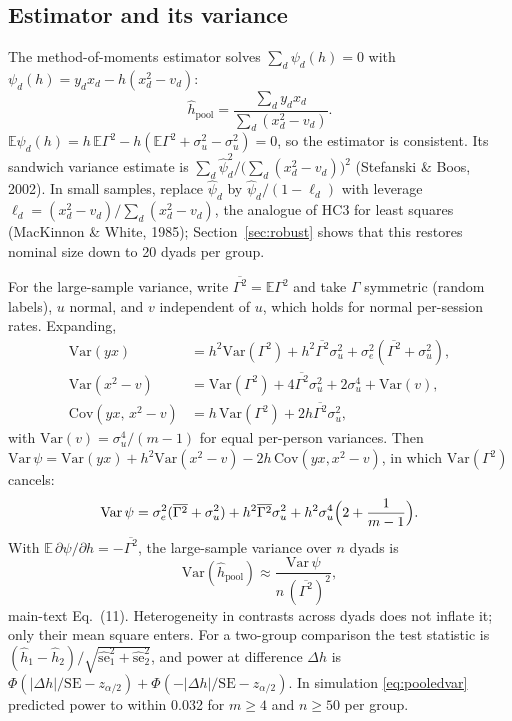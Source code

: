 \documentclass[12pt]{article}
\theoremstyle{definition}
\begin{document}
\subsection{Estimator and its variance}

The method-of-moments estimator solves $\sum_d\psi_d(h)=0$ with
$\psi_d(h)=y_dx_d-h(x_d^2-v_d)$:
\[
\hat h_{\mathrm{pool}}=\frac{\sum_dy_dx_d}{\sum_d(x_d^2-v_d)} .
\]
$\mathbb{E}\psi_d(h)=h\,\mathbb{E}\Gamma^2-h(\mathbb{E}\Gamma^2+\sigma_u^2-\sigma_u^2)=0$,
so the estimator is consistent. Its sandwich variance estimate is
$\sum_d\hat\psi_d^2/\bigl(\sum_d(x_d^2-v_d)\bigr)^2$ (Stefanski \& Boos, 2002). In small
samples, replace $\hat\psi_d$ by $\hat\psi_d/(1-\ell_d)$ with leverage
$\ell_d=(x_d^2-v_d)/\sum_d(x_d^2-v_d)$, the analogue of HC3 for least squares
(MacKinnon \& White, 1985); Section~\ref{sec:robust} shows that this restores
nominal size down to 20 dyads per group.

For the large-sample variance, write $\overline{\Gamma^2}=\mathbb{E}\Gamma^2$ and take
$\Gamma$ symmetric (random labels), $u$ normal, and $v$ independent of $u$, which
holds for normal per-session rates. Expanding,
\begin{align*}
\mathrm{Var}(y x)&=h^2\mathrm{Var}(\Gamma^2)+h^2\overline{\Gamma^2}\sigma_u^2+\sigma_e^2(\overline{\Gamma^2}+\sigma_u^2),\\
\mathrm{Var}(x^2-v)&=\mathrm{Var}(\Gamma^2)+4\overline{\Gamma^2}\sigma_u^2+2\sigma_u^4+\mathrm{Var}(v),\\
\mathrm{Cov}(yx,\,x^2-v)&=h\,\mathrm{Var}(\Gamma^2)+2h\overline{\Gamma^2}\sigma_u^2,
\end{align*}
with $\mathrm{Var}(v)=\sigma_u^4/(m-1)$ for equal per-person variances. Then
$\mathrm{Var}\,\psi=\mathrm{Var}(yx)+h^2\mathrm{Var}(x^2-v)-2h\,\mathrm{Cov}(yx,x^2-v)$, in
which $\mathrm{Var}(\Gamma^2)$ cancels:
\[
\mathrm{Var}\,\psi=\sigma_e^2(\overline{\Gamma^2}+\sigma_u^2)+h^2\overline{\Gamma^2}\sigma_u^2
+h^2\sigma_u^4\Bigl(2+\frac{1}{m-1}\Bigr).
\]
With $\mathbb{E}\,\partial\psi/\partial h=-\overline{\Gamma^2}$, the large-sample
variance over $n$ dyads is
\begin{equation}\label{eq:pooledvar}
\mathrm{Var}(\hat h_{\mathrm{pool}})\approx\frac{\mathrm{Var}\,\psi}{n\,(\overline{\Gamma^2})^2},
\end{equation}
main-text Eq.~(11). Heterogeneity in contrasts across dyads does not inflate it;
only their mean square enters. For a two-group comparison the test statistic is
$(\hat h_1-\hat h_2)/\sqrt{\widehat{\mathrm{se}}_1^2+\widehat{\mathrm{se}}_2^2}$, and
power at difference $\Delta h$ is
$\Phi(|\Delta h|/\mathrm{SE}-z_{\alpha/2})+\Phi(-|\Delta h|/\mathrm{SE}-z_{\alpha/2})$.
In simulation \eqref{eq:pooledvar} predicted power to within 0.032 for $m\ge4$ and
$n\ge50$ per group.
\end{document}
